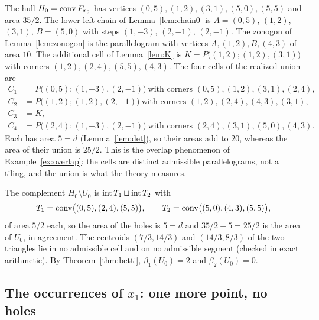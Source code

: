 The hull $H_0=\operatorname{conv} F_{x_0}$ has vertices $(0,5),(1,2),(3,1),(5,0),(5,5)$ and area $35/2$. The lower-left chain of Lemma~\ref{lem:chain0} is $A=(0,5)$, $(1,2)$, $(3,1)$, $B=(5,0)$ with steps $(1,-3)$, $(2,-1)$, $(2,-1)$. The zonogon of Lemma~\ref{lem:zonogon} is the parallelogram with vertices $A,(1,2),B,(4,3)$ of area $10$. The additional cell of Lemma~\ref{lem:K} is $K=P\bigl((1,2);(1,2),(3,1)\bigr)$ with corners $(1,2),(2,4),(5,5),(4,3)$. The four cells of the realized union are
\begin{align*}
  C_1&=P\bigl((0,5);(1,-3),(2,-1)\bigr)\ \text{with corners }(0,5),(1,2),(3,1),(2,4),\\
  C_2&=P\bigl((1,2);(1,2),(2,-1)\bigr)\ \text{with corners }(1,2),(2,4),(4,3),(3,1),\\
  C_3&=K,\\
  C_4&=P\bigl((2,4);(1,-3),(2,-1)\bigr)\ \text{with corners }(2,4),(3,1),(5,0),(4,3).
\end{align*}
Each has area $5=d$ (Lemma~\ref{lem:det}), so their areas add to $20$, whereas the area of their union is $25/2$. This is the overlap phenomenon of Example~\ref{ex:overlap}: the cells are distinct admissible parallelograms, not a tiling, and the union is what the theory measures.

The complement $H_0\setminus U_0$ is $\operatorname{int} T_1\sqcup\operatorname{int} T_2$ with
\[
  T_1=\operatorname{conv}\bigl((0,5),(2,4),(5,5)\bigr),\qquad T_2=\operatorname{conv}\bigl((5,0),(4,3),(5,5)\bigr),
\]
of area $5/2$ each, so the area of the holes is $5=d$ and $35/2-5=25/2$ is the area of $U_0$, in agreement. The centroids $(7/3,14/3)$ and $(14/3,8/3)$ of the two triangles lie in no admissible cell and on no admissible segment (checked in exact arithmetic). By Theorem~\ref{thm:betti}, $\beta_1(U_0)=2$ and $\beta_2(U_0)=0$.

\subsection{\texorpdfstring{The occurrences of $x_1$: one more point, no holes}{The occurrences of x1: one more point, no holes}}

